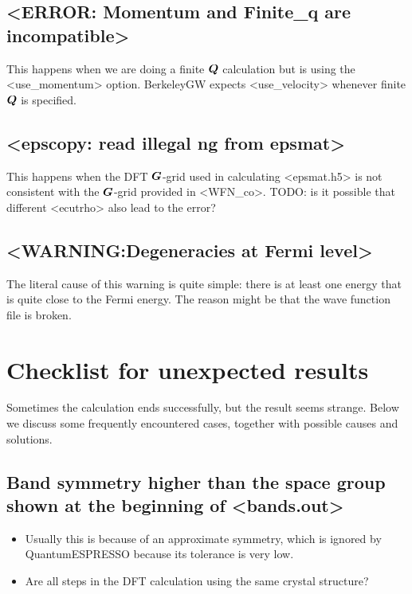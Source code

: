 \documentclass[hyperref, a4paper, 12pt]{report}
\def\texttt#1{<#1>}%
\newcommand{\shortcode}[1]{\texttt{#1}}
\begin{document}
\subsection{\shortcode{ERROR: Momentum and Finite_q are incompatible}}

This happens when we are doing a finite $\vb*{Q}$ calculation 
but is using the \shortcode{use_momentum} option.
BerkeleyGW expects \shortcode{use_velocity} 
whenever finite $\vb*{Q}$ is specified.

\subsection{\shortcode{epscopy: read illegal ng from epsmat}}

This happens when the DFT $\vb*{G}$-grid used in calculating \shortcode{epsmat.h5} 
is not consistent with the $\vb*{G}$-grid provided in \shortcode{WFN_co}.
TODO: is it possible that different \shortcode{ecutrho} also lead to the error? 

\subsection{\shortcode{WARNING:Degeneracies at Fermi level}}

The literal cause of this warning is quite simple: 
there is at least one energy that is quite close to the Fermi energy.
The reason might be that the wave function file is broken.

\section{Checklist for unexpected results}

Sometimes the calculation ends successfully,
but the result seems strange.
Below we discuss some frequently encountered cases, 
together with possible causes and solutions. 

\subsection{Band symmetry higher than the space group shown at the beginning of \shortcode{bands.out}}

\begin{itemize}
    \item Usually this is because of an approximate symmetry,
    which is ignored by QuantumESPRESSO because its tolerance is very low.
    \item Are all steps in the DFT calculation using the same crystal structure?
\end{itemize}
\end{document}
